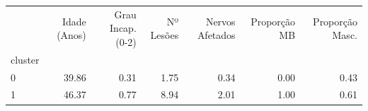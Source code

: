 \begin{tabular}{lrrrrrr}
\toprule
 & Idade (Anos) & Grau Incap. (0-2) & Nº Lesões & Nervos Afetados & Proporção MB & Proporção Masc. \\
cluster &  &  &  &  &  &  \\
\midrule
0 & 39.86 & 0.31 & 1.75 & 0.34 & 0.00 & 0.43 \\
1 & 46.37 & 0.77 & 8.94 & 2.01 & 1.00 & 0.61 \\
\bottomrule
\end{tabular}

